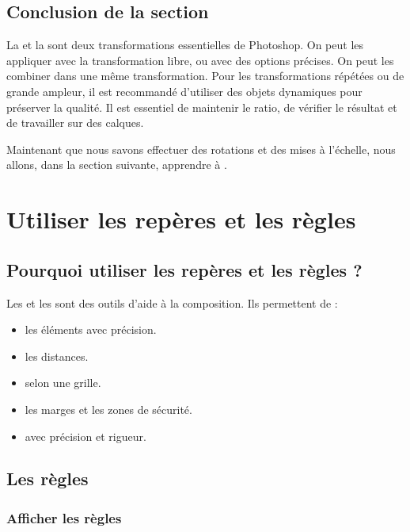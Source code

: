 \subsection*{Conclusion de la section}

La  et la  sont deux transformations essentielles de Photoshop. On peut les appliquer avec la transformation libre, ou avec des options précises. On peut les combiner dans une même transformation. Pour les transformations répétées ou de grande ampleur, il est recommandé d'utiliser des objets dynamiques pour préserver la qualité. Il est essentiel de maintenir le ratio, de vérifier le résultat et de travailler sur des calques.

Maintenant que nous savons effectuer des rotations et des mises à l'échelle, nous allons, dans la section suivante, apprendre à .

\section{Utiliser les repères et les règles}

\subsection{Pourquoi utiliser les repères et les règles ?}

Les  et les  sont des outils d'aide à la composition. Ils permettent de :

\begin{itemize}
    \item {} les éléments avec précision.
    \item {} les distances.
    \item {} selon une grille.
    \item {} les marges et les zones de sécurité.
    \item {} avec précision et rigueur.
\end{itemize}

\subsection{Les règles}

\subsubsection{Afficher les règles}

